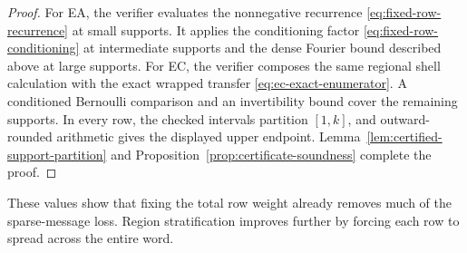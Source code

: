 \begin{proof}
For EA, the verifier evaluates the nonnegative recurrence
\eqref{eq:fixed-row-recurrence} at small supports.  It applies the conditioning
factor \eqref{eq:fixed-row-conditioning} at intermediate supports and the
dense Fourier bound described above at large supports.  For EC, the verifier
composes the same regional shell calculation with the exact wrapped transfer
\eqref{eq:ec-exact-enumerator}.  A conditioned Bernoulli comparison and an
invertibility bound cover the remaining supports.  In every row, the checked
intervals partition $[1,k]$, and outward-rounded arithmetic gives the
displayed upper endpoint.  Lemma~\ref{lem:certified-support-partition} and
Proposition~\ref{prop:certificate-soundness} complete the proof.
\end{proof}

These values show that fixing the total row weight already removes much of
the sparse-message loss.  Region stratification improves further by forcing
each row to spread across the entire word.
